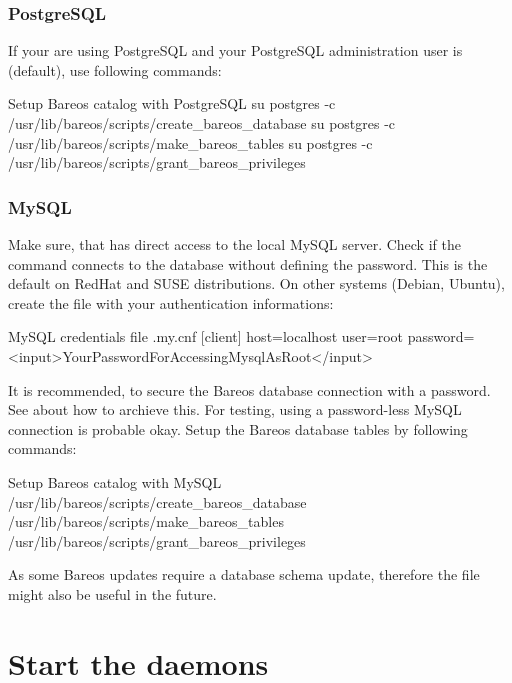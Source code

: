 \subsubsection{PostgreSQL}
If your are using PostgreSQL and your PostgreSQL administration user is  (default), use following commands:

\begin{commands}{Setup Bareos catalog with PostgreSQL}
su postgres -c /usr/lib/bareos/scripts/create_bareos_database
su postgres -c /usr/lib/bareos/scripts/make_bareos_tables
su postgres -c /usr/lib/bareos/scripts/grant_bareos_privileges
\end{commands}


\subsubsection{MySQL}
Make sure, that  has direct access to the local MySQL server. 
Check if the command  connects to the database without defining the password.
This is the default on RedHat and SUSE distributions. 
On other systems (Debian, Ubuntu),
create the file  with your authentication informations:

\begin{config}{MySQL credentials file .my.cnf}
[client]
host=localhost
user=root
password=<input>YourPasswordForAccessingMysqlAsRoot</input>
\end{config}

It is recommended, to secure the Bareos database connection with a password.
See  about how to archieve this.
For testing, using a password-less MySQL connection is probable okay.
Setup the Bareos database tables by following commands:
\begin{commands}{Setup Bareos catalog with MySQL}
/usr/lib/bareos/scripts/create_bareos_database
/usr/lib/bareos/scripts/make_bareos_tables
/usr/lib/bareos/scripts/grant_bareos_privileges
\end{commands}

As some Bareos updates require a database schema update,
therefore the file  might also be useful in the future.


\section{Start the daemons}
    \label{sec:StartDaemons}

